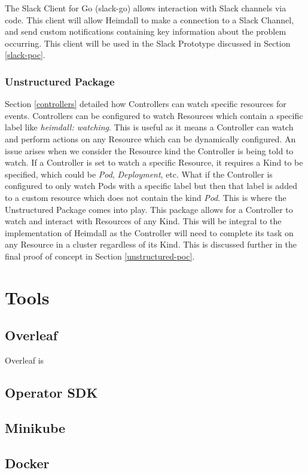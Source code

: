 \documentclass{article}
\begin{document}
The Slack Client for Go (slack-go) allows interaction with Slack channels via code. This client will allow Heimdall to make a connection to a Slack Channel, and send custom notifications containing key information about the problem occurring. This client will be used in the Slack Prototype discussed in Section \ref{slack-poc}.

\subsubsection{Unstructured Package}

Section \ref{controllers} detailed how Controllers can watch specific resources for events. Controllers can be configured to watch Resources which contain a specific label like \emph{heimdall: watching}. This is useful as it means a Controller can watch and perform actions on any Resource which can be dynamically configured. An issue arises when we consider the Resource kind the Controller is being told to watch. If a Controller is set to watch a specific Resource, it requires a Kind to be specified, which could be \emph{Pod}, \emph{Deployment}, etc. What if the Controller is configured to only watch Pods with a specific label but then that label is added to a custom resource which does not contain the kind \emph{Pod}. This is where the Unstructured Package comes into play. This package allows for a Controller to watch and interact with Resources of any Kind. This will be integral to the implementation of Heimdall as the Controller will need to complete its task on any Resource in a cluster regardless of its Kind. This is discussed further in the final proof of concept in Section \ref{unstructured-poc}.
\section{Tools}

\subsection{Overleaf}
Overleaf is 

\subsection{Operator SDK} \label{osdk}
\subsection{Minikube}
\subsection{Docker}
\end{document}
